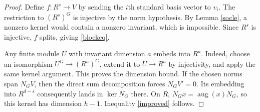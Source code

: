 \documentclass[11pt,a4paper]{article}
\numberwithin{equation}{section}
\begin{document}
\begin{proof}
Define $f:R^s\to V$ by sending the $i$th standard basis vector to $v_i$. The restriction to $(R^s)^G$ is injective by the norm hypothesis. By Lemma \ref{socle}, a nonzero kernel would contain a nonzero invariant, which is impossible. Since $R^s$ is injective, $f$ splits, giving \eqref{blockeq}.

Any finite module $U$ with invariant dimension $a$ embeds into $R^a$. Indeed, choose an isomorphism $U^G\to(R^a)^G$, extend it to $U\to R^a$ by injectivity, and apply the same kernel argument. This proves the dimension bound. If the chosen norms span $N_GV$, then the direct sum decomposition forces $N_GV'=0$. Its embedding into $R^{d-s}$ consequently lands in $\ker N_G$ there. On $R$, $N_Gx=\operatorname{aug}(x)N_G$, so this kernel has dimension $h-1$. Inequality \eqref{improved} follows.
\end{proof}
\end{document}
